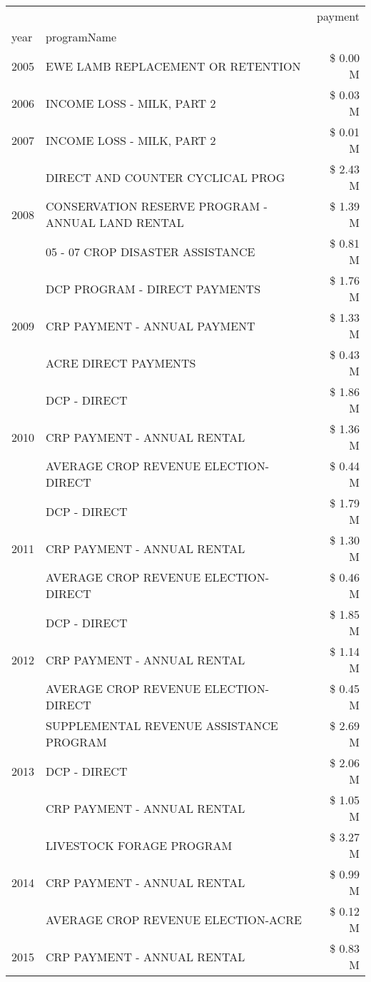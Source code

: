\begin{tabular}{llr}
\toprule
 &  & payment \\
year & programName &  \\
\midrule
2005 & EWE LAMB REPLACEMENT OR RETENTION & \$ 0.00 M \\
\cline{1-3}
2006 & INCOME LOSS - MILK, PART 2 & \$ 0.03 M \\
\cline{1-3}
2007 & INCOME LOSS - MILK, PART 2 & \$ 0.01 M \\
\cline{1-3}
\multirow[t]{3}{*}{2008} & DIRECT AND COUNTER CYCLICAL PROG & \$ 2.43 M \\
 & CONSERVATION RESERVE PROGRAM - ANNUAL LAND RENTAL & \$ 1.39 M \\
 & 05 - 07 CROP DISASTER ASSISTANCE & \$ 0.81 M \\
\cline{1-3}
\multirow[t]{3}{*}{2009} & DCP PROGRAM - DIRECT PAYMENTS & \$ 1.76 M \\
 & CRP PAYMENT - ANNUAL PAYMENT & \$ 1.33 M \\
 & ACRE DIRECT PAYMENTS & \$ 0.43 M \\
\cline{1-3}
\multirow[t]{3}{*}{2010} & DCP - DIRECT & \$ 1.86 M \\
 & CRP PAYMENT - ANNUAL RENTAL & \$ 1.36 M \\
 & AVERAGE CROP REVENUE ELECTION-DIRECT & \$ 0.44 M \\
\cline{1-3}
\multirow[t]{3}{*}{2011} & DCP - DIRECT & \$ 1.79 M \\
 & CRP PAYMENT - ANNUAL RENTAL & \$ 1.30 M \\
 & AVERAGE CROP REVENUE ELECTION-DIRECT & \$ 0.46 M \\
\cline{1-3}
\multirow[t]{3}{*}{2012} & DCP - DIRECT & \$ 1.85 M \\
 & CRP PAYMENT - ANNUAL RENTAL & \$ 1.14 M \\
 & AVERAGE CROP REVENUE ELECTION-DIRECT & \$ 0.45 M \\
\cline{1-3}
\multirow[t]{3}{*}{2013} & SUPPLEMENTAL REVENUE ASSISTANCE PROGRAM & \$ 2.69 M \\
 & DCP - DIRECT & \$ 2.06 M \\
 & CRP PAYMENT - ANNUAL RENTAL & \$ 1.05 M \\
\cline{1-3}
\multirow[t]{3}{*}{2014} & LIVESTOCK FORAGE PROGRAM & \$ 3.27 M \\
 & CRP PAYMENT - ANNUAL RENTAL & \$ 0.99 M \\
 & AVERAGE CROP REVENUE ELECTION-ACRE & \$ 0.12 M \\
\cline{1-3}
\multirow[t]{3}{*}{2015} & CRP PAYMENT - ANNUAL RENTAL & \$ 0.83 M \\

\end{tabular}
